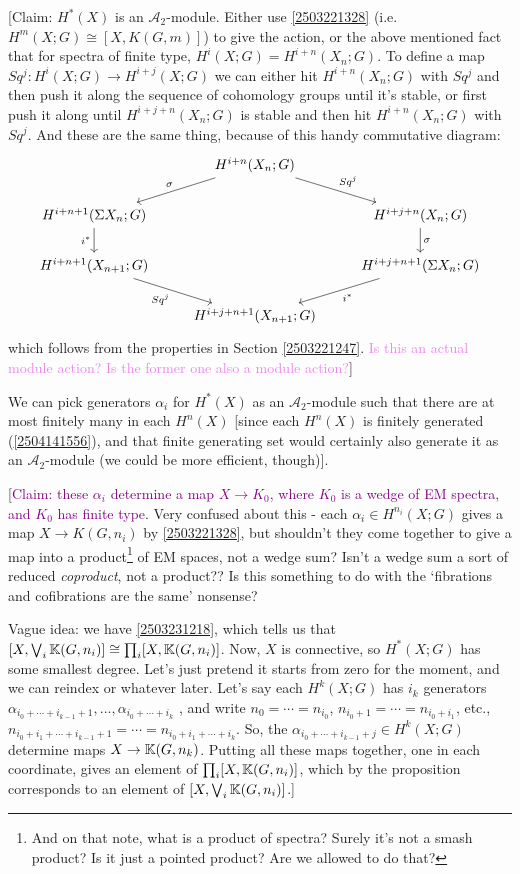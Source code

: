 \documentclass{MetricNotes2023}
\def\bb{\ensuremath\mathbb}
\def\A{\ensuremath{\mathscr{A}_2}}
\def\textcolour{\textcolor}
\begin{document}
[Claim: \(H^*(X)\) is an \(\mathscr{A}_2\)-module. Either use \ref{2503221328} (i.e. \(H^m(X;G)\cong[X,K(G,m)]\)) to give the action, or the above mentioned fact that for spectra of finite type, \(H^i(X; G)=H^{i+n}(X_n;G)\). To define a map \(Sq^j : H^{i}(X;G)\to H^{i+j}(X;G)\) we can either hit \(H^{i+n}(X_n;G)\) with \(Sq^j\) and then push it along the sequence of cohomology groups until it's stable, or first push it along until \(H^{i+j+n}(X_n;G)\) is stable and then hit \(H^{i+n}(X_n;G)\) with \(Sq^j\). And these are the same thing, because of this handy commutative diagram:
\[\begin{tikzcd} 
 & H^{i+n}(X_n;G)  \arrow[dl, "\sigma"'] \arrow[dr, "Sq^j"] & \\ 
 H^{i+n+1}(\Sigma X_n;G) \arrow[d, "i^*"'] & & H^{i+j+n}(X_n;G) \arrow[d, "\sigma"] \\ 
 H^{i+n+1}(X_{n+1};G) \arrow[dr, "Sq^j"'] & & H^{i+j+n+1}(\Sigma X_n;G) \arrow[dl, "i^*"] \\ 
 & H^{i+j+n+1}(X_{n+1};G) &  
\end{tikzcd}\] 
which follows from the properties in Section  \ref{2503221247}. \textcolour{violet}{Is this an actual module action? Is the former one also a module action?}]

We can pick generators \(\alpha_i\) for \(H^*(X)\) as an \(\mathscr{A}_2\)-module such that there are at most finitely many in each \(H^n(X)\) [since each \(H^n(X)\) is finitely generated (\ref{2504141556}), and that finite generating set would certainly also generate it as an \(\A\)-module (we could be more efficient, though)].

[\textcolour{purple}{Claim: these \(\alpha_i\) determine a map \(X \to K_0\), where \(K_0\) is a wedge of EM spectra, and \(K_0\) has finite type}. Very confused about this - each \(\alpha_i\in H^{n_i}(X;G)\) gives a map \(X \to K(G,n_i)\) by \ref{2503221328}, but shouldn't they  come together to give a map into a product\footnote{And on that note, what is a product of spectra? Surely it's not a smash product? Is it just a pointed product? Are we allowed to do that?} of EM spaces, not a wedge sum? Isn't a wedge sum a sort of reduced \textit{coproduct}, not a product?? Is this something to do with the `fibrations and cofibrations are the same' nonsense?

Vague idea: we have \ref{2503231218}, which tells us that \([X, \bigvee_i \bb{K}(G,n_i)]\cong \prod_i[X, \bb{K}(G,n_i)]\). Now, \(X\) is connective, so \(H^*(X;G)\) has some smallest degree. Let's just pretend it starts from zero for the moment, and we can reindex or whatever later. Let's say each \(H^k(X;G)\) has \(i_k\) generators \(\alpha_{i_0+\cdots+i_{k-1}+1}, ...,\alpha_{i_0+\cdots+i_k}\)  , and write \(n_0=\cdots=n_{i_0}\), \(n_{i_0+1}=\cdots= n_{i_0+i_1}\), etc., \(n_{i_0+i_1+\cdots+i_{k-1}+1}=\cdots = n_{i_0+i_1+\cdots+i_k}\). So, the \(\alpha_{i_0+\cdots+i_{k-1}+j}\in H^k(X;G)\) determine maps \(X\to \bb{K}(G,n_k)\). Putting all these maps together, one in each coordinate, gives an element of \(\prod_i[X, \bb{K}(G,n_i)]\), which by the proposition corresponds to an element of \([X, \bigvee_i \bb{K}(G,n_i)]\).] 
\end{document}
